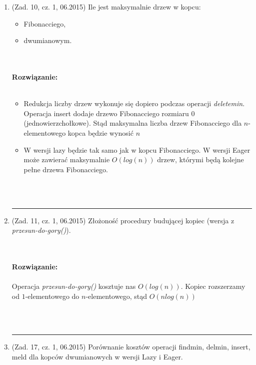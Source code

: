 \documentclass[10pt]{article}%
\newcommand{\beginsolution}{\textbf{\\~\\ \textbf{Rozwiązanie:} \\~\\}}
\newcommand{\finishsolution}{~\\~\\ \noindent\rule{11cm}{0.4pt}}
\begin{document}
\begin{enumerate}
\item (Zad. 10, cz. 1, 06.2015) Ile jest maksymalnie drzew w kopcu:
\begin{itemize}
	\item Fibonacciego,
	\item dwumianowym.
\end{itemize}

\beginsolution
\begin{itemize}
	\item Redukcja liczby drzew wykonuje się dopiero podczas operacji \textit{deletemin}. Operacja insert dodaje drzewo Fibonacciego rozmiaru 0 (jednowierzchołkowe). Stąd maksymalna liczba drzew Fibonacciego dla $n$-elementowego kopca będzie wynosić $n$
	\item W wersji lazy będzie tak samo jak w kopcu Fibonacciego. W wersji Eager może zawierać maksymalnie $O(log(n))$ drzew, którymi będą kolejne pełne drzewa Fibonacciego.
\end{itemize}

\finishsolution

\item (Zad. 11, cz. 1, 06.2015) Złożoność procedury budującej kopiec (wersja z \textit{przesun-do-gory()}).

\beginsolution 
Operacja \textit{przesun-do-gory()} kosztuje nas $O(log(n))$. Kopiec rozszerzamy od $1$-elementowego do $n$-elementowego, stąd $O(n log(n))$

\finishsolution

\item (Zad. 17, cz. 1, 06.2015) Porównanie kosztów operacji { findmin, delmin, insert, meld } dla kopców dwumianowych w wersji Lazy i Eager.


\end{enumerate}
\end{document}
